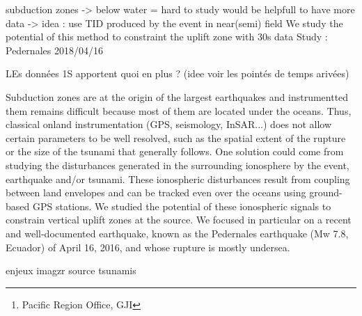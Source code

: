 \documentclass{gji}
\title[Localization of the maximum acoustic coupling zone]
  {}
\author[F. Zedek L. Rolland et al.]
  {F. Zedek$^1$\thanks{Pacific Region Office, GJI}, L. Rolland$^1$ et al. \\
Affiliation Geoazur
  }
\date{Received ; in original form }
\begin{document}

\label{firstpage}

\maketitle


\begin{summary}
  subduction zones -> below water = hard to study
     would be helpfull to have more data
            -> idea : use TID produced by the event in near(semi) field 
    We study the potential of this method to constraint the uplift zone with 30s data 
    Study : Pedernales 2018/04/16 

LEs données 1S apportent quoi en plus ? (idee voir les pointés de temps arivées)

Subduction zones are at the origin of the largest earthquakes and instrumentted them remains difficult because most of them are located under the oceans. Thus, classical onland instrumentation (GPS, seismology, InSAR...) does not allow certain parameters to be well resolved, such as the spatial extent of the rupture or the size of the tsunami that generally follows. One solution could come from studying the disturbances generated in the surrounding ionosphere by the event, earthquake and/or tsunami. These ionospheric disturbances result from coupling between land envelopes and can be tracked even over the oceans using ground-based GPS stations. We studied the potential of these ionospheric signals to constrain vertical uplift zones at the source. We focused in particular on a recent and well-documented earthquake, known as the Pedernales earthquake (Mw 7.8, Ecuador) of April 16, 2016, and whose rupture is mostly undersea.

enjeux imagzr source tsunamis
\end{summary}
\end{document}
